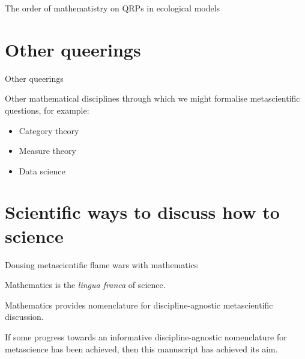 \documentclass{beamer}
\begin{document}
\begin{frame}{\large{The order of mathematistry on QRPs in ecological models}}
\begin{adjustbox}{max totalsize={.9\textwidth}{.9\textheight},center}
\end{adjustbox}

\end{frame}



\section{Other queerings}

\begin{frame}{Other queerings}

Other mathematical disciplines through which we might formalise metascientific questions, for example:

\bigskip

\begin{itemize}
    \item Category theory
    \item Measure theory
    \item Data science
\end{itemize}

\end{frame}

\section{Scientific ways to discuss how to science}

\begin{frame}{Dousing metascientific flame wars with mathematics}
    
Mathematics is the \emph{lingua franca} of science.

\bigskip

Mathematics provides nomenclature for discipline-agnostic metascientific discussion.

\bigskip

If some progress towards an informative discipline-agnostic nomenclature for metascience has been achieved, then this manuscript has achieved its aim.
    
\end{frame}
\end{document}
